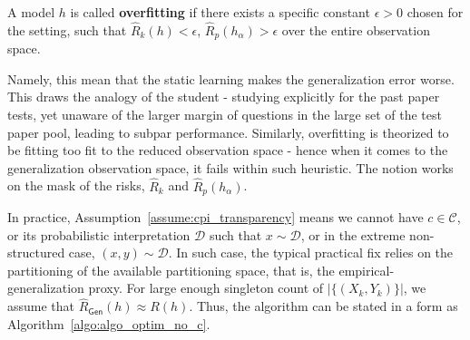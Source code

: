 \documentclass[
  journal=largetwo,
  year=2025,
  volume=37,
]{cup-journal}
\begin{document}
\begin{definition}[Overfitting]
  A model $h$ is called \textbf{overfitting} if there exists a specific constant $\epsilon>0$ chosen for the setting, such that $\hat{R}_{k}(h)<\epsilon$, $\hat{R}_{p}(h_{\alpha})> \epsilon$ over the entire observation space.
\end{definition}
Namely, this mean that the static learning makes the generalization error worse. This draws the analogy of the student - studying explicitly for the past paper tests, yet unaware of the larger margin of questions in the large set of the test paper pool, leading to subpar performance. Similarly, overfitting is theorized to be fitting too fit to the reduced observation space - hence when it comes to the generalization observation space, it fails within such heuristic. The notion works on the mask of the risks, $\hat{R}_{k}$ and $\hat{R}_{p}(h_{\alpha})$. 

In practice, Assumption~\ref{assume:cpi_transparency} means we cannot have $c\in\mathcal{C}$, or its probabilistic interpretation $\mathcal{D}$ such that $x\sim\mathcal{D}$, or in the extreme non-structured case, $(x,y)\sim \mathcal{D}$. In such case, the typical practical fix relies on the partitioning of the available partitioning space, that is, the empirical-generalization proxy. For large enough singleton count of $|\{(X_{k},Y_{k})\}|$, we assume that $\hat{R}_{\mathsf{Gen}}(h)\approx R(h)$. Thus, the algorithm can be stated in a form as Algorithm~\ref{algo:algo_optim_no_c}.
\end{document}
